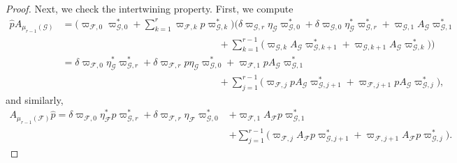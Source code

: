 \documentclass[10pt,a4paper]{amsart}
\begin{document}
\begin{proof}
Next, we check the intertwining property. First, we compute
\begin{align*}
\widehat{p}A_{\scriptscriptstyle\mu_{r-1}(\mathcal{G})}&=\biggl(\varpi_{\scriptscriptstyle\mathcal{F},0}\varpi_{\scriptscriptstyle\mathcal{G},0}^* +\sum\limits_{k=1}^r\varpi_{\scriptscriptstyle\mathcal{F},k} p\varpi_{\scriptscriptstyle\mathcal{G},k}^*\biggr)\biggl(\delta\varpi_{\scriptscriptstyle\mathcal{G},r}\eta_{\scriptscriptstyle\mathcal{G}}\varpi_{\scriptscriptstyle\mathcal{G},0}^*+\delta\varpi_{\scriptscriptstyle\mathcal{G},0}\eta^*_{\scriptscriptstyle\mathcal{G}}\varpi_{\scriptscriptstyle\mathcal{G},r}^*+\varpi_{\scriptscriptstyle\mathcal{G},1} A_{\scriptscriptstyle\mathcal{G}}\varpi_{\scriptscriptstyle\mathcal{G},1}^*\\
&\qquad\qquad\qquad\qquad\qquad\qquad\qquad\qquad+\sum\limits_{k=1}^{r-1}\bigl(\varpi_{\scriptscriptstyle\mathcal{G},k} A_\mathcal{G}\varpi_{\scriptscriptstyle\mathcal{G},k+1}^* +\varpi_{\scriptscriptstyle\mathcal{G},k+1} A_\mathcal{G}\varpi_{\scriptscriptstyle\mathcal{G},k}^*\bigr)\biggr)\\
&=\delta\varpi_{\scriptscriptstyle\mathcal{F},0}\eta_{\scriptscriptstyle\mathcal{G}}^*\varpi_{\scriptscriptstyle\mathcal{G},r}^* +\delta\varpi_{\scriptscriptstyle\mathcal{F},r}p\eta_{\scriptscriptstyle\mathcal{G}}\varpi_{\scriptscriptstyle\mathcal{G},0}^* +\varpi_{\scriptscriptstyle\mathcal{F},1}pA_{\scriptscriptstyle\mathcal{G}}\varpi_{\scriptscriptstyle\mathcal{G},1}^*\\
&\qquad\qquad\qquad\qquad\qquad\qquad\qquad\qquad+\sum\limits_{j=1}^{r-1}\bigl(\varpi_{\scriptscriptstyle\mathcal{F},j}pA_{\scriptscriptstyle\mathcal{G}}\varpi_{\scriptscriptstyle\mathcal{G},j+1}^*+\varpi_{\scriptscriptstyle\mathcal{F},j+1}pA_{\scriptscriptstyle\mathcal{G}}\varpi_{\scriptscriptstyle\mathcal{G},j}^*\bigr),
\end{align*}
and similarly,
\begin{align*}
A_{\scriptscriptstyle\mu_{r-1}(\mathcal{F})}\widehat{p}=\delta\varpi_{\scriptscriptstyle\mathcal{F},0}\eta_{\scriptscriptstyle\mathcal{F}}^* p\varpi_{\scriptscriptstyle\mathcal{G},r}^* +\delta\varpi_{\scriptscriptstyle\mathcal{F},r}\eta_{\scriptscriptstyle\mathcal{F}}\varpi_{\scriptscriptstyle\mathcal{G},0}^* &+\varpi_{\scriptscriptstyle\mathcal{F},1}A_{\scriptscriptstyle\mathcal{F}}p\varpi_{\scriptscriptstyle\mathcal{G},1}^*\\
&+\sum\limits_{j=1}^{r-1}\bigl(\varpi_{\scriptscriptstyle\mathcal{F},j}A_{\scriptscriptstyle\mathcal{F}}p\varpi_{\scriptscriptstyle\mathcal{G},j+1}^*+\varpi_{\scriptscriptstyle\mathcal{F},j+1}A_{\scriptscriptstyle\mathcal{F}}p\varpi_{\scriptscriptstyle\mathcal{G},j}^*\bigr).

\end{align*}
\end{proof}
\end{document}
